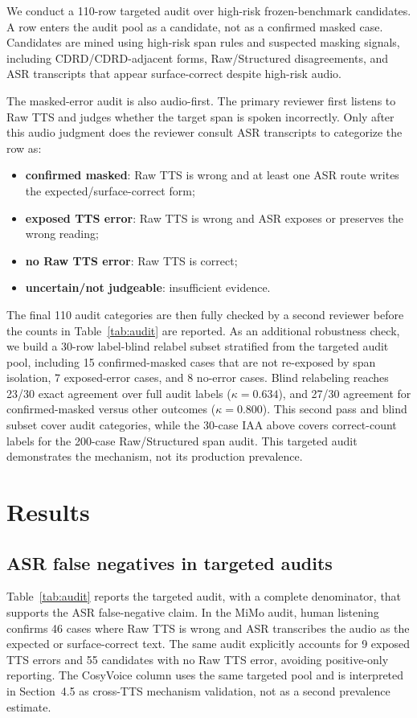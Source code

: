 \documentclass{article}
\begin{document}
We conduct a 110-row targeted audit over high-risk frozen-benchmark candidates. A row enters the audit pool as a candidate, not as a confirmed masked case. Candidates are mined using high-risk span rules and suspected masking signals, including CDRD/CDRD-adjacent forms, Raw/Structured disagreements, and ASR transcripts that appear surface-correct despite high-risk audio.

The masked-error audit is also audio-first. The primary reviewer first listens to Raw TTS and judges whether the target span is spoken incorrectly. Only after this audio judgment does the reviewer consult ASR transcripts to categorize the row as:
\begin{itemize}
\item \textbf{confirmed masked}: Raw TTS is wrong and at least one ASR route writes the expected/surface-correct form;
\item \textbf{exposed TTS error}: Raw TTS is wrong and ASR exposes or preserves the wrong reading;
\item \textbf{no Raw TTS error}: Raw TTS is correct;
\item \textbf{uncertain/not judgeable}: insufficient evidence.
\end{itemize}
The final 110 audit categories are then fully checked by a second reviewer before the counts in Table~\ref{tab:audit} are reported. As an additional robustness check, we build a 30-row label-blind relabel subset stratified from the targeted audit pool, including 15 confirmed-masked cases that are not re-exposed by span isolation, 7 exposed-error cases, and 8 no-error cases. Blind relabeling reaches 23/30 exact agreement over full audit labels ($\kappa=0.634$), and 27/30 agreement for confirmed-masked versus other outcomes ($\kappa=0.800$). This second pass and blind subset cover audit categories, while the 30-case IAA above covers correct-count labels for the 200-case Raw/Structured span audit.
This targeted audit demonstrates the mechanism, not its production prevalence.

\section{Results}

\subsection{ASR false negatives in targeted audits}

Table~\ref{tab:audit} reports the targeted audit, with a complete denominator, that supports the ASR false-negative claim. In the MiMo audit, human listening confirms 46 cases where Raw TTS is wrong and ASR transcribes the audio as the expected or surface-correct text. The same audit explicitly accounts for 9 exposed TTS errors and 55 candidates with no Raw TTS error, avoiding positive-only reporting. The CosyVoice column uses the same targeted pool and is interpreted in Section~4.5 as cross-TTS mechanism validation, not as a second prevalence estimate.
\end{document}
